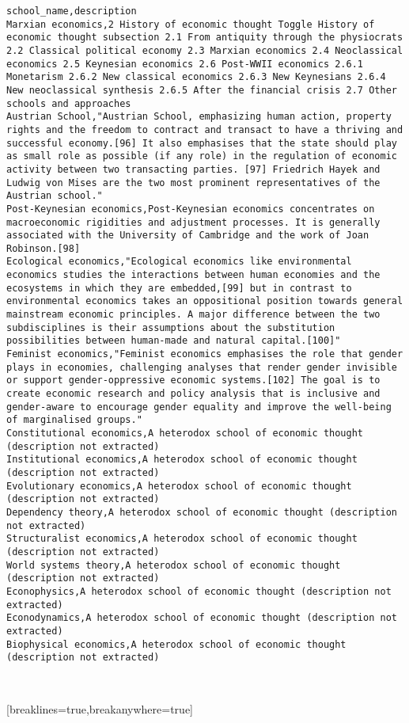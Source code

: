 \documentclass{article}
\begin{document}
\begin{Verbatim}
school_name,description
Marxian economics,2 History of economic thought Toggle History of economic thought subsection 2.1 From antiquity through the physiocrats 2.2 Classical political economy 2.3 Marxian economics 2.4 Neoclassical economics 2.5 Keynesian economics 2.6 Post-WWII economics 2.6.1 Monetarism 2.6.2 New classical economics 2.6.3 New Keynesians 2.6.4 New neoclassical synthesis 2.6.5 After the financial crisis 2.7 Other schools and approaches
Austrian School,"Austrian School, emphasizing human action, property rights and the freedom to contract and transact to have a thriving and successful economy.[96] It also emphasises that the state should play as small role as possible (if any role) in the regulation of economic activity between two transacting parties. [97] Friedrich Hayek and Ludwig von Mises are the two most prominent representatives of the Austrian school."
Post-Keynesian economics,Post-Keynesian economics concentrates on macroeconomic rigidities and adjustment processes. It is generally associated with the University of Cambridge and the work of Joan Robinson.[98]
Ecological economics,"Ecological economics like environmental economics studies the interactions between human economies and the ecosystems in which they are embedded,[99] but in contrast to environmental economics takes an oppositional position towards general mainstream economic principles. A major difference between the two subdisciplines is their assumptions about the substitution possibilities between human-made and natural capital.[100]"
Feminist economics,"Feminist economics emphasises the role that gender plays in economies, challenging analyses that render gender invisible or support gender-oppressive economic systems.[102] The goal is to create economic research and policy analysis that is inclusive and gender-aware to encourage gender equality and improve the well-being of marginalised groups."
Constitutional economics,A heterodox school of economic thought (description not extracted)
Institutional economics,A heterodox school of economic thought (description not extracted)
Evolutionary economics,A heterodox school of economic thought (description not extracted)
Dependency theory,A heterodox school of economic thought (description not extracted)
Structuralist economics,A heterodox school of economic thought (description not extracted)
World systems theory,A heterodox school of economic thought (description not extracted)
Econophysics,A heterodox school of economic thought (description not extracted)
Econodynamics,A heterodox school of economic thought (description not extracted)
Biophysical economics,A heterodox school of economic thought (description not extracted)

    
\end{Verbatim}[breaklines=true,breakanywhere=true]
\end{document}
